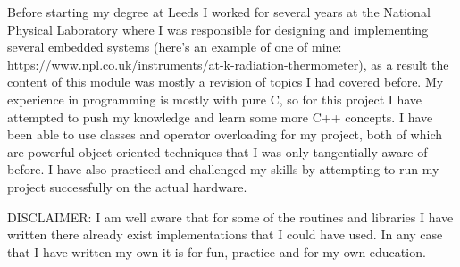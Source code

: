 \documentclass[10pt, a4paper]{article}
\def\vs{\vspace{6pt}}
\begin{document}
Before starting my degree at Leeds I worked for several years at the National Physical Laboratory where I was responsible for designing and implementing several embedded systems (here's an example of one of mine: https://www.npl.co.uk/instruments/at-k-radiation-thermometer), as a result the content of this module was mostly a revision of topics I had covered before. My experience in programming is mostly with pure C, so for this project I have attempted to push my knowledge and learn some more C++ concepts. I have been able to use classes and operator overloading for my project, both of which are powerful object-oriented techniques that I was only tangentially aware of before. I have also practiced and challenged my skills by attempting to run my project successfully on the actual hardware.

\vs
DISCLAIMER: I am well aware that for some of the routines and libraries I have written there already exist implementations that I could have used. In any case that I have written my own it is for fun, practice and for my own education. 
\end{document}
